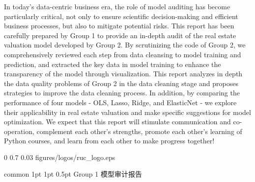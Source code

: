 \documentclass[
    report,     %
    oneside,    %
    UTF8,       %
    zihao=-4    %
]{config} %
\def \minorTitleCN {Group 1 模型审计报告} %
\begin{document}
\begin{abstractEN}[0.6cm] %

In today's data-centric business era, the role of model auditing has become particularly critical, 
not only to ensure scientific decision-making and efficient business processes, but also to mitigate potential risks. 
This report has been carefully prepared by Group 1 to provide an in-depth audit of the real estate valuation model developed by Group 2. 
By scrutinizing the code of Group 2, we comprehensively reviewed each step from data cleansing to model training and prediction, 
and extracted the key data in model training to enhance the transparency of the model through visualization. 
This report analyzes in depth the data quality problems of Group 2 in the data cleaning stage and proposes strategies to improve the data cleaning process. 
In addition, by comparing the performance of four models - OLS, Lasso, Ridge, and ElasticNet - we explore their applicability in real estate valuation and make specific suggestions for model optimization. 
We expect that this report will stimulate communication and co-operation, complement each other's strengths, promote each other's learning of Python courses, and learn from each other to make progress together!

\def\keywordsEN{Model validation; Linear models; Real estate valuation; Machine learning}

\end{abstractEN}


\vspace{13pt}
\vspace{20pt}


\imageWatermark %
    {0} %
    {0.7} %
    {0.03} %
    {figures/logos/ruc_logo.eps} %


\Header
    {common} %
    {1pt} %
    {1pt} %
    {0.5pt} %
    {\minorTitleCN} %
    {} %
    {\currentChapterInfo} %
\end{document}
